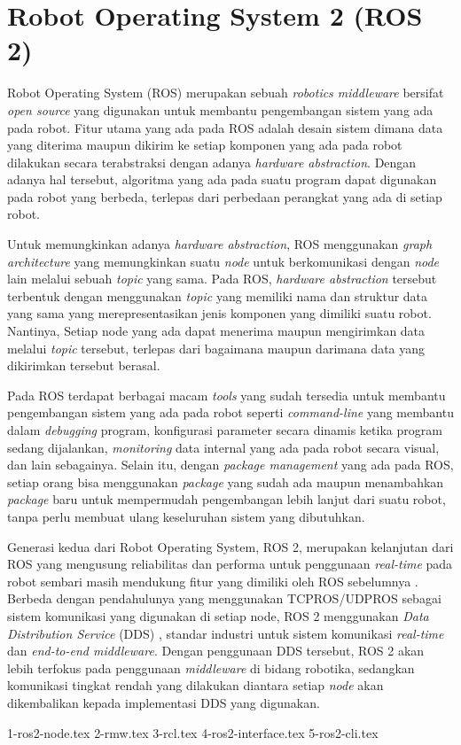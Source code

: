 \section{Robot Operating System 2 (ROS 2)}
\label{sec:ros2}

Robot Operating System (ROS) \citep{cit:quigley2009} merupakan sebuah \emph{robotics middleware} bersifat \emph{open source} yang digunakan untuk membantu pengembangan sistem yang ada pada robot.
Fitur utama yang ada pada ROS adalah desain sistem dimana data yang diterima maupun dikirim ke setiap komponen yang ada pada robot dilakukan secara terabstraksi dengan adanya \emph{hardware abstraction}.
Dengan adanya hal tersebut,
	algoritma yang ada pada suatu program dapat digunakan pada robot yang berbeda,
	terlepas dari perbedaan perangkat yang ada di setiap robot.

Untuk memungkinkan adanya \emph{hardware abstraction},
	ROS menggunakan \emph{graph architecture} yang memungkinkan suatu \emph{node} untuk berkomunikasi dengan \emph{node} lain melalui sebuah \emph{topic} yang sama.
Pada ROS, \emph{hardware abstraction} tersebut terbentuk dengan menggunakan \emph{topic} yang memiliki nama dan struktur data yang sama yang merepresentasikan jenis komponen yang dimiliki suatu robot.
Nantinya, Setiap node yang ada dapat menerima maupun mengirimkan data melalui \emph{topic} tersebut,
	terlepas dari bagaimana maupun darimana data yang dikirimkan tersebut berasal.

Pada ROS terdapat berbagai macam \emph{tools} yang sudah tersedia untuk membantu pengembangan sistem yang ada pada robot seperti \emph{command-line} yang membantu dalam \emph{debugging} program,
	konfigurasi parameter secara dinamis ketika program sedang dijalankan,
	\emph{monitoring} data internal yang ada pada robot secara visual,
	dan lain sebagainya.
Selain itu, dengan \emph{package management} yang ada pada ROS,
	setiap orang bisa menggunakan \emph{package} yang sudah ada maupun menambahkan \emph{package} baru untuk mempermudah pengembangan lebih lanjut dari suatu robot,
	tanpa perlu membuat ulang keseluruhan sistem yang dibutuhkan.

Generasi kedua dari Robot Operating System, ROS 2,
	merupakan kelanjutan dari ROS yang mengusung reliabilitas dan performa untuk penggunaan \emph{real-time} pada robot sembari masih mendukung fitur yang dimiliki oleh ROS sebelumnya \citep{cit:maruyama2016}.
Berbeda dengan pendahulunya yang menggunakan TCPROS/UDPROS sebagai sistem komunikasi yang digunakan di setiap node,
	ROS 2 menggunakan \emph{Data Distribution Service} (DDS) \citep{cit:castellote2003} \citep{cit:schlesselman2004}, standar industri untuk sistem komunikasi \emph{real-time} dan \emph{end-to-end middleware}.
Dengan penggunaan DDS tersebut, ROS 2 akan lebih terfokus pada penggunaan \emph{middleware} di bidang robotika,
	sedangkan komunikasi tingkat rendah yang dilakukan diantara setiap \emph{node} akan dikembalikan kepada implementasi DDS yang digunakan.

{1-ros2-node.tex}
{2-rmw.tex}
{3-rcl.tex}
{4-ros2-interface.tex}
{5-ros2-cli.tex}

